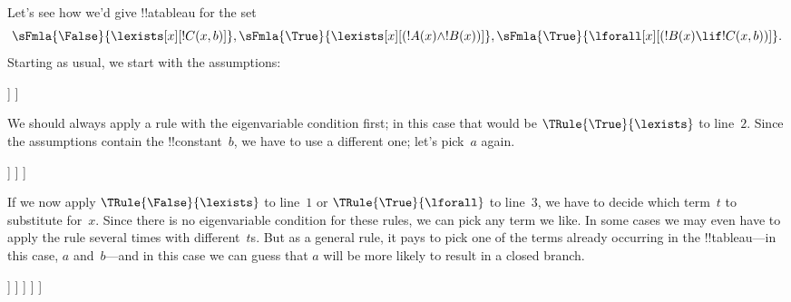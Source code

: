 \begin{ex}
Let's see how we'd give !!a{tableau} for the set
\[
\sFmla{\False}{\lexists[x][!C(x,b)]},
\sFmla{\True}{\lexists[x][(!A(x) \land !B(x))]},
\sFmla{\True}{\lforall[x][(!B(x) \lif !C(x,b))]}.
\]
Starting as usual, we start with the assumptions:
\begin{oltableau}
  [\sFmla{\False}{\lexists[x][\formula{C}(x,b)]}, just=\TAss
    [\sFmla{\True}{\lexists[x][(\formula{A}(x) \land \formula{B}(x))]},
      just=\TAss
      [\sFmla{\True}{\lforall[x][(\formula{B}(x) \lif \formula{C}(x,b))]},
        just=\TAss]
    ]
  ]
\end{oltableau}
We should always apply a rule with the eigenvariable condition first;
in this case that would be $\TRule{\True}{\lexists}$ to
line~$2$. Since the assumptions contain the !!{constant}~$b$, we have
to use a different one; let's pick~$a$ again.
\begin{oltableau}
  [\sFmla{\False}{\lexists[x][\formula{C}(x,b)]}, just=\TAss
    [\sFmla{\True}{\lexists[x][(\formula{A}(x) \land \formula{B}(x))]},
      just=\TAss, checked
      [\sFmla{\True}{\lforall[x][(\formula{B}(x) \lif \formula{C}(x,b))]},
        just=\TAss
        [\sFmla{\True}{\formula{A}(a) \land \formula{B}(a)},
          just={\TRule{\True}{\lexists}[2]}]
      ]
    ]
  ]
\end{oltableau}
If we now apply $\TRule{\False}{\lexists}$ to line~$1$ or
$\TRule{\True}{\lforall}$ to line~$3$, we have to decide which term~$t$
to substitute for~$x$. Since there is no eigenvariable condition for
these rules, we can pick any term we like. In some cases we may even
have to apply the rule several times with different~$t$s. But as a
general rule, it pays to pick one of the terms already occurring in the
!!{tableau}---in this case, $a$ and~$b$---and in this case we can
guess that $a$ will be more likely to result in a closed branch.
\begin{oltableau}
  [\sFmla{\False}{\lexists[x][\formula{C}(x,b)]}, just=\TAss
    [\sFmla{\True}{\lexists[x][(\formula{A}(x) \land \formula{B}(x))]},
      just=\TAss, checked
      [\sFmla{\True}{\lforall[x][(\formula{B}(x) \lif \formula{C}(x,b))]}, just=\TAss
        [\sFmla{\True}{\formula{A}(a) \land \formula{B}(a)}, just={\TRule{\True}{\lexists}[2]}
          [\sFmla{\False}{\formula{C}(a,b)}, just={\TRule{\False}{\lexists}[1]}
            [\sFmla{\True}{\formula{B}(a) \lif \formula{C}(a,b)},
              just={\TRule{\True}{\lforall}[3]}
            ]
          ]
        ]
      ]
    ]
  ]
\end{oltableau}

\end{ex}
